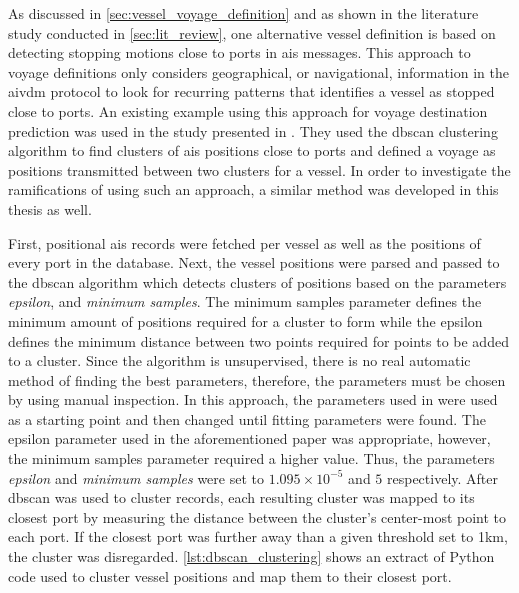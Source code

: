 As discussed in \cref{sec:vessel_voyage_definition} and as shown in the literature study conducted in \cref{sec:lit_review}, one alternative vessel definition is based on detecting stopping motions close to ports in \acrshort{ais} messages. This approach to voyage definitions only considers geographical, or navigational, information in the \gls{aivdm} protocol to look for recurring patterns that identifies a vessel as stopped close to ports. An existing example using this approach for voyage destination prediction was used in the study presented in \cite{Zhang2020AISApproach}. They used the \acrfull{dbscan} clustering algorithm to find clusters of \acrshort{ais} positions close to ports and defined a voyage as positions transmitted between two clusters for a vessel. In order to investigate the ramifications of using such an approach, a similar method was developed in this thesis as well.

First, positional \acrshort{ais} records were fetched per vessel as well as the positions of every port in the database. Next, the vessel positions were parsed and passed to the \acrshort{dbscan} algorithm which detects clusters of positions based on the parameters \textit{epsilon}, and \textit{minimum samples}. The minimum samples parameter defines the minimum amount of positions required for a cluster to form while the epsilon defines the minimum distance between two points required for points to be added to a cluster. Since the algorithm is unsupervised, there is no real automatic method of finding the best parameters, therefore, the parameters must be chosen by using manual inspection. In this approach, the parameters used in \cite{Zhang2020AISApproach} were used as a starting point and then changed until fitting parameters were found. The epsilon parameter used in the aforementioned paper was appropriate, however, the minimum samples parameter required a higher value. Thus, the parameters \textit{epsilon} and \textit{minimum samples} were set to $1.095 \times 10^{-5}$ and $5$ respectively. After \acrshort{dbscan} was used to cluster records, each resulting cluster was mapped to its closest port by measuring the distance between the cluster's center-most point to each port. If the closest port was further away than a given threshold set to 1km, the cluster was disregarded. \cref{lst:dbscan_clustering} shows an extract of Python code used to cluster vessel positions and map them to their closest port.

